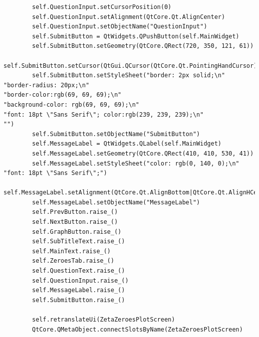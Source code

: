 \documentclass{article}
\begin{document}
\begin{lstlisting}
        self.QuestionInput.setCursorPosition(0)
        self.QuestionInput.setAlignment(QtCore.Qt.AlignCenter)
        self.QuestionInput.setObjectName("QuestionInput")
        self.SubmitButton = QtWidgets.QPushButton(self.MainWidget)
        self.SubmitButton.setGeometry(QtCore.QRect(720, 350, 121, 61))
        self.SubmitButton.setCursor(QtGui.QCursor(QtCore.Qt.PointingHandCursor))
        self.SubmitButton.setStyleSheet("border: 2px solid;\n"
"border-radius: 20px;\n"
"border-color:rgb(69, 69, 69);\n"
"background-color: rgb(69, 69, 69);\n"
"font: 18pt \"Sans Serif\"; color:rgb(239, 239, 239);\n"
"")
        self.SubmitButton.setObjectName("SubmitButton")
        self.MessageLabel = QtWidgets.QLabel(self.MainWidget)
        self.MessageLabel.setGeometry(QtCore.QRect(410, 410, 530, 41))
        self.MessageLabel.setStyleSheet("color: rgb(0, 140, 0);\n"
"font: 18pt \"Sans Serif\";")
        self.MessageLabel.setAlignment(QtCore.Qt.AlignBottom|QtCore.Qt.AlignHCenter)
        self.MessageLabel.setObjectName("MessageLabel")
        self.PrevButton.raise_()
        self.NextButton.raise_()
        self.GraphButton.raise_()
        self.SubTitleText.raise_()
        self.MainText.raise_()
        self.ZeroesTab.raise_()
        self.QuestionText.raise_()
        self.QuestionInput.raise_()
        self.MessageLabel.raise_()
        self.SubmitButton.raise_()

        self.retranslateUi(ZetaZeroesPlotScreen)
        QtCore.QMetaObject.connectSlotsByName(ZetaZeroesPlotScreen)


\end{lstlisting}
\end{document}
